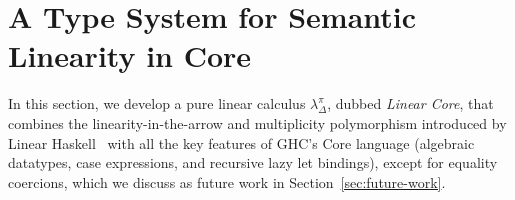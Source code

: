 \documentclass[acmsmall,review,screen]{acmart}
\begin{document}
  

\section{A Type System for Semantic Linearity in Core\label{sec:main:linear-core}}

In this section, we develop a pure linear calculus $\lambda_\Delta^\pi$,
dubbed \emph{Linear Core}, that combines the linearity-in-the-arrow
and multiplicity polymorphism introduced by Linear
Haskell~\cite{cite:linearhaskell} with all the key features of GHC's Core
language (algebraic datatypes, case expressions, and recursive lazy let bindings),
except for equality coercions, which we discuss as future work in
Section~\ref{sec:future-work}. 
%
\end{document}
